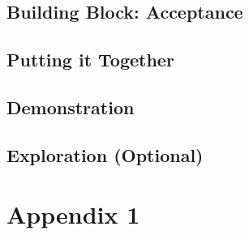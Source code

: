 \documentclass[]{article}
\begin{document}
\subsection{Building Block: Acceptance}


\subsection{Putting it Together}


\subsection{Demonstration}


\subsection{Exploration (Optional)}

\newpage
\section{Appendix 1}

\end{document}

